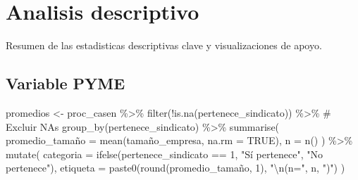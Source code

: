 \documentclass[
  a4paper,
  oneside]{scrbook}
\newenvironment{Shaded}{\begin{snugshade}}{\end{snugshade}}
\newcommand{\AttributeTok}[1]{\textcolor[rgb]{0.40,0.45,0.13}{#1}}
\newcommand{\CommentTok}[1]{\textcolor[rgb]{0.37,0.37,0.37}{#1}}
\newcommand{\ConstantTok}[1]{\textcolor[rgb]{0.56,0.35,0.01}{#1}}
\newcommand{\DecValTok}[1]{\textcolor[rgb]{0.68,0.00,0.00}{#1}}
\newcommand{\FunctionTok}[1]{\textcolor[rgb]{0.28,0.35,0.67}{#1}}
\newcommand{\NormalTok}[1]{\textcolor[rgb]{0.00,0.23,0.31}{#1}}
\newcommand{\OtherTok}[1]{\textcolor[rgb]{0.00,0.23,0.31}{#1}}
\newcommand{\SpecialCharTok}[1]{\textcolor[rgb]{0.37,0.37,0.37}{#1}}
\newcommand{\StringTok}[1]{\textcolor[rgb]{0.13,0.47,0.30}{#1}}
\begin{document}
\section{Analisis descriptivo}\label{analisis-descriptivo}

Resumen de las estadisticas descriptivas clave y visualizaciones de
apoyo.

\subsection{Variable PYME}\label{variable-pyme}

\begin{Shaded}
\begin{Highlighting}[]
\NormalTok{promedios }\OtherTok{\textless{}{-}}\NormalTok{ proc\_casen }\SpecialCharTok{\%\textgreater{}\%}
  \FunctionTok{filter}\NormalTok{(}\SpecialCharTok{!}\FunctionTok{is.na}\NormalTok{(pertenece\_sindicato)) }\SpecialCharTok{\%\textgreater{}\%}  \CommentTok{\# Excluir NAs}
  \FunctionTok{group\_by}\NormalTok{(pertenece\_sindicato) }\SpecialCharTok{\%\textgreater{}\%}
  \FunctionTok{summarise}\NormalTok{(}
\NormalTok{    promedio\_tamaño }\OtherTok{=} \FunctionTok{mean}\NormalTok{(tamaño\_empresa, }\AttributeTok{na.rm =} \ConstantTok{TRUE}\NormalTok{),}
    \AttributeTok{n =} \FunctionTok{n}\NormalTok{()}
\NormalTok{  ) }\SpecialCharTok{\%\textgreater{}\%}
  \FunctionTok{mutate}\NormalTok{(}
    \AttributeTok{categoria =} \FunctionTok{ifelse}\NormalTok{(pertenece\_sindicato }\SpecialCharTok{==} \DecValTok{1}\NormalTok{, }\StringTok{"Sí pertenece"}\NormalTok{, }\StringTok{"No pertenece"}\NormalTok{),}
    \AttributeTok{etiqueta =} \FunctionTok{paste0}\NormalTok{(}\FunctionTok{round}\NormalTok{(promedio\_tamaño, }\DecValTok{1}\NormalTok{), }\StringTok{"}\SpecialCharTok{\textbackslash{}n}\StringTok{(n="}\NormalTok{, n, }\StringTok{")"}\NormalTok{)}
\NormalTok{  )}


\end{Highlighting}
\end{Shaded}
\end{document}
